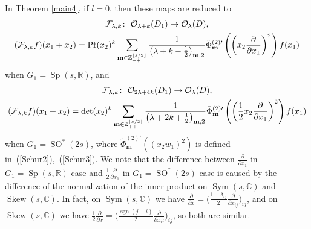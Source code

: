 \documentclass[pdftex]{sigma}
\numberwithin{equation}{section}
\newcommand{\bm}{\mathbf{m}}
\newcommand{\BZ}{\mathbb{Z}}
\newcommand{\BR}{\mathbb{R}}
\newcommand{\BC}{\mathbb{C}}
\newcommand{\cF}{\mathcal{F}}
\newcommand{\cO}{\mathcal{O}}
\newcommand{\Pf}{\operatorname{Pf}}
\newcommand{\sgn}{\operatorname{sgn}}
\newcommand{\Sym}{\operatorname{Sym}}
\newcommand{\Skew}{\operatorname{Skew}}
\begin{document}
In Theorem \ref{main4}, if $l=0$, then these maps are reduced to
\begin{gather}
\cF_{\lambda,k}\colon \ \cO_{\lambda+k}(D_1)\to \cO_\lambda(D), \notag \\
(\cF_{\lambda,k}f)(x_1+x_2)=\Pf(x_2)^k
\sum_{\bm\in\BZ_{++}^{\lfloor s/2\rfloor}}\frac{1}{\left(\lambda+k-\frac{1}{2}\right)_{\bm,2}}
\tilde{\Phi}_\bm^{(2)\prime}\left(\left(x_2\frac{\partial}{\partial x_1}\right)^2\right)f(x_1) \label{SU-Sp}
\end{gather}
when $G_1=\operatorname{Sp}(s,\BR)$, and
\begin{gather}
\cF_{\lambda,k}\colon \ \cO_{2\lambda+4k}(D_1)\to \cO_\lambda(D), \notag \\
(\cF_{\lambda,k}f)(x_1+x_2)=\det(x_2)^k
\sum_{\bm\in\BZ_{++}^{\lfloor s/2\rfloor}}\frac{1}{\left(\lambda+2k+\frac{1}{2}\right)_{\bm,2}}
\tilde{\Phi}_\bm^{(2)\prime}\left(\left(\frac{1}{2}x_2\frac{\partial}{\partial x_1}\right)^2\right)f(x_1) \label{SU-SO*}
\end{gather}
when $G_1=\operatorname{SO}^*(2s)$, where $\tilde{\Phi}^{(2)\prime}_\bm\left((x_2w_1)^2\right)$ is defined in~(\ref{Schur2}),~(\ref{Schur3}). We note that the difference between $\frac{\partial}{\partial x_1}$ in $G_1=\operatorname{Sp}(s,\BR)$ case and $\frac{1}{2}\frac{\partial}{\partial x_1}$ in $G_1=\operatorname{SO}^*(2s)$ case is caused by the difference of the normalization of the inner product on $\Sym(s,\BC)$ and $\Skew(s,\BC)$. In fact, on $\Sym(s,\BC)$ we have $\frac{\partial}{\partial x}=\big(\frac{1+\delta_{ij}}{2}\frac{\partial}{\partial x_{ij}}\big)_{ij}$, and on $\Skew(s,\BC)$ we have $ \frac{1}{2}\frac{\partial}{\partial x}=\big(\frac{\sgn(j-i)}{2}\frac{\partial}{\partial x_{ij}}\big)_{ij}$, so both are similar.
\end{document}
